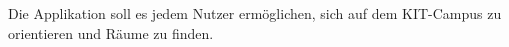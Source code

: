 
Die Applikation soll es jedem Nutzer ermöglichen,
sich auf dem KIT-Campus zu orientieren und Räume zu finden.